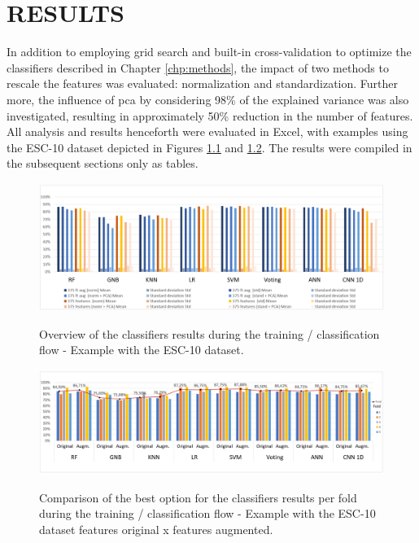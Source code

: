 \chapter{RESULTS}
\label{chp:results}

In addition to employing grid search and built-in cross-validation to optimize the classifiers described in Chapter \ref{chp:methods}, the impact of two methods to rescale the features was evaluated: normalization and standardization. Further more, the influence of \gls{pca} by considering 98\% of the explained variance was also investigated, resulting in approximately 50\% reduction in the number of features. All analysis and results henceforth were evaluated in Excel, with examples using the ESC-10 dataset depicted in Figures \ref{fig:results_ESC-10_classification_results_overview} and \ref{fig:results_ESC-10_classification_results_fold_overview}. The results were compiled in the subsequent sections only as tables.

\begin{figure}[htbp]
    \centering
        \caption{Overview of the classifiers results during the training / classification flow - Example with the ESC-10 dataset.}
        \includegraphics[width=1\textwidth]{resources/images/060-results/Results_classification_flow_ESC-10_2.png}
        \label{fig:results_ESC-10_classification_results_overview}
\end{figure}

\begin{figure}[htbp]
    \centering
        \caption{Comparison of the best option for the classifiers results per fold during the training / classification flow - Example with the ESC-10 dataset features original x features augmented.}
        \includegraphics[width=.95\textwidth]{resources/images/060-results/Results_classification_flow_ESC-10_1.png}
        \label{fig:results_ESC-10_classification_results_fold_overview}
\end{figure}


